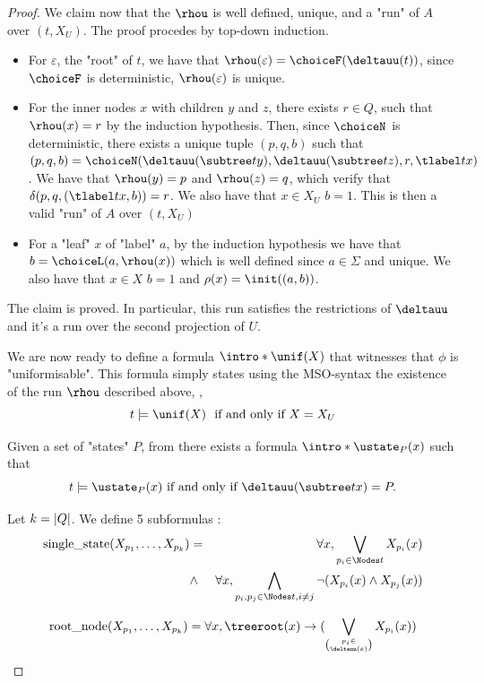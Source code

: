 \documentclass[twoside]{article}
\begin{document}
\begin{proof}
	We claim now that the $\rhou$ is well defined, unique, and a "run" of $A$ over $(t,X_U)$. The proof procedes by top-down induction.
	\begin{itemize}
		\item For $\varepsilon$, the "root" of $t$, we have that $\rhou(\varepsilon) = \choiceF(\deltauu(t))$, since $\choiceF$ is deterministic, $\rhou(\varepsilon)$ is unique.
		\item For the inner nodes $x$ with children $y$ and $z$, there exists $r \in Q$, such that $\rhou (x) = r$ by the induction hypothesis. Then,
		      since $\choiceN$ is deterministic, there exists a unique tuple $(p,q,b)$ such that $(p,q,b) = \choiceN(\deltauu(\subtree t y), \deltauu(\subtree t z), r, \tlabel t x)$.
		      We have that $\rhou(y) = p$ and $\rhou(z) = q$, which verify that $\delta(p,q,(\tlabel t x,b)) = r$. We also have that $x \in X_U$ \tiff $b = 1$. This is then a valid "run"
		      of $A$ over $(t,X_U)$
		\item For a "leaf" $x$ of "label" $a$, by the induction hypothesis we have that $b = \choiceL(a, \rhou(x))$ which is well defined since $a \in \Sigma$ and unique.
		      We also have that $x \in X$ \tiff $b = 1$ and $\rho(x) = \init ((a,b))$.
	\end{itemize}
	The claim is proved. In particular, this run satisfies the restrictions of $\deltauu$ and it's a run over the second projection of $U$.

	We are now ready to define a formula $\intro*\unif (X)$ that witnesses that $\phi$ is "uniformisable".
	This formula simply states using the MSO-syntax the existence of the run $\rhou$ described above, \ie,
	\[  t \models \unif(X) \text{ \tiff } X=X_U \]


	Given a set of "states" $P$, from  there exists a formula $\intro* \ustate_P(x)$ such that
	\[ t \models \ustate_P(x) \text{ if and only if } \deltauu(\subtree t x) = P .\]

	Let $k = \left|Q\right|$.
	We define 5 subformulas :
	\begin{eqnarray*}
		\text{single\_state} (X_{p_1}, \ldots, X_{p_k})  &=& \forall x, \bigvee_{p_i \in \Nodes t} X_{p_i} (x)\\
		&\land& \forall x, \bigwedge_{p_i, p_j \in \Nodes t, i \neq j} \lnot(X_{p_i} (x) \land X_{p_j}(x))
	\end{eqnarray*}

	\begin{equation*}
		\text{root\_node} (X_{p_1}, \ldots, X_{p_k})  = \forall x, \treeroot(x) \ra (\bigvee_{p_i \in \choose \deltauu(\varepsilon)} X_{p_i}(x))
	\end{equation*}


\end{proof}
\end{document}
